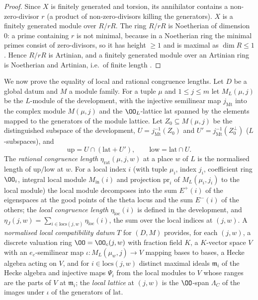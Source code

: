 \begin{proof}
Since $X$ is finitely generated and torsion, its annihilator contains a non-zero-divisor $r$ (a product of
non-zero-divisors killing the generators). $X$ is a finitely generated module over $R/rR$. The ring $R/rR$ is
Noetherian of dimension $0$: a prime containing $r$ is not minimal, because in a Noetherian ring the minimal primes
consist of zero-divisors, so it has height $\ge1$ and is maximal as $\dim R\le1$. Hence $R/rR$ is Artinian, and a
finitely generated module over an Artinian ring is Noetherian and Artinian, i.e.\ of finite length
\cite[Ch.~4, Ch.~6 and Thm.~8.5]{AtiyahMacdonald1969}.
\end{proof}

We now prove the equality of local and rational congruence lengths. Let $D$ be a global datum and $M$ a
module family. For a tuple $\mu$ and $1\le j\le m$ let $M_L(\mu,j)$ be the $L$-module of the development, with the
injective semilinear map $j_{\mathrm{Mt}}$ into the complex module $M(\mu,j)$ and the $\OO_L$-lattice $\mathrm{lat}$ spanned by
the elements mapped to the generators of the module lattice. Let $Z_0\subseteq M(\mu,j)$ be the distinguished
subspace of the development, $U=j_{\mathrm{Mt}}^{-1}(Z_0)$ and $U'=j_{\mathrm{Mt}}^{-1}(Z_0^{\perp})$ ($L$-subspaces), and
\[
  \mathrm{up}=U\cap(\mathrm{lat}+U'),\qquad \mathrm{low}=\mathrm{lat}\cap U .
\]
The \emph{rational congruence length} $\eta_{\mathrm{rat}}(\mu,j,w)$ at a place $w$ of $L$ is the normalised length of
$\mathrm{up}/\mathrm{low}$ at $w$. For a local index $i$ (with tuple $\mu_i$, index $j_i$, coefficient ring $\OO_i$, integral
local module $M_{\mathrm{in}}(i)$ and projection $\mathrm{pr}_i$ of $M_L(\mu_i,j_i)$ to the local module) the local module
decomposes into the sum $E^+(i)$ of the eigenspaces at the good points of the theta locus and the sum $E^-(i)$ of
the others; the \emph{local congruence length} $\eta_{\mathrm{loc}}(i)$ is defined in the development, and
$\eta_J(j,w)=\sum_{i\in\mathrm{locs}(j,w)}\eta_{\mathrm{loc}}(i)$, the sum over the local indices at $(j,w)$. A \emph{normalised local
compatibility datum} $T$ for $(D,M)$ provides, for each $(j,w)$, a discrete valuation ring $\OO=\OO_c(j,w)$ with
fraction field $K$, a $K$-vector space $V$ with an $e_c$-semilinear map $\iota:M_L(\mu_w,j)\to V$ mapping bases to bases,
a Hecke algebra acting on $V$, and for $i\in\mathrm{locs}(j,w)$ distinct maximal ideals $\mathfrak m_i$ of the Hecke algebra
and injective maps $\Psi_i$ from the local modules to $V$ whose ranges are the parts of $V$ at $\mathfrak m_i$; the
\emph{local lattice} at $(j,w)$ is the $\OO$-span $\Lambda_C$ of the images under $\iota$ of the generators of $\mathrm{lat}$.

